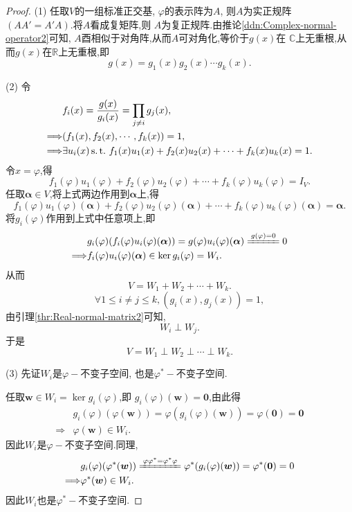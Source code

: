 \begin{proof}
  (1) 任取$V$的一组标准正交基, $\varphi$的表示阵为$A$,
  则$A$为实正规阵$(AA'=A'A)$.将$A$看成复矩阵,则
  $A$为复正规阵.由推论\ref{ddn:Complex-normal-operator2}可知,
  $A$酉相似于对角阵,从而$A$可对角化,等价于$g(x)$在
  $\mathbb{C}$上无重根,从而$g(x)$在$\mathbb{R}$上无重根,即
  \[
    g(x)=g_1(x)g_2(x)\cdots g_k(x).
  \]

  (2) 令
  \begin{align*}
    & f_i(x)=\frac{g(x)}{g_i(x)}=\prod_{j\neq i}g_j(x),\\
    \Longrightarrow & (f_1(x),f_2(x),\cdots,f_k(x))=1,\\
    \Longrightarrow & \exists u_i(x) \operatorname{{}s.t.{}}  f_1(x)u_1(x)+f_2(x)u_2(x)+\cdots+f_k(x)u_k(x)=1.
  \end{align*}
  令$x=\varphi$,得
  \[
    f_1(\varphi)u_1(\varphi)+f_2(\varphi)u_2(\varphi)+\cdots+f_k(\varphi)u_k(\varphi)=I_V.
  \]
  任取$\bm{\alpha}\in V$,将上式两边作用到$\bm{\alpha}$上,得
  \[
    f_1(\varphi)u_1(\varphi)(\bm{\alpha})+f_2(\varphi)u_2(\varphi)(\bm{\alpha})+\cdots+f_k(\varphi)u_k(\varphi)(\bm{\alpha})=\bm{\alpha}.
  \]
  将$g_i(\varphi)$作用到上式中任意项上,即
  \begin{align*}
    & g_i(\varphi)(f_i(\varphi)u_i(\varphi)(\bm{\alpha}))=
      g(\varphi)u_i(\varphi)(\bm{\alpha}) \xlongequal {g(\varphi)=0} 0\\
    \Longrightarrow & f_i(\varphi)u_i(\varphi)(\bm{\alpha})\in\ker g_i(\varphi)= W_i.
  \end{align*}
  从而
  \[
    V=W_1+W_2+\cdots+W_k.
  \]
  \[
    \forall 1\leq i \neq j \leq k, (g_i(x),g_j(x))=1,
  \]
  由引理\ref{thr:Real-normal-matrix2}可知,
  \[
    W_i\perp W_j.
  \]
  于是
  \[
    V=W_1\perp W_2 \perp\cdots\perp W_k.
  \]

  (3) 先证$W_i$是$\varphi-$不变子空间,
  也是$\varphi^*-$不变子空间.

  任取$\bm{w}\in W_i=\ker g_i(\varphi)$,即
  $g_i(\varphi)(\bm{w})=\bm{0}$,由此得
  \begin{align*}
    & g_i(\varphi)(\varphi(\bm{w}))=\varphi(g_i(\varphi)(\bm{w}))
      =\varphi(\bm{0})=\bm{0}\\
    \Longrightarrow & \varphi(\bm{w})\in W_i.
  \end{align*}
  因此$W_i$是$\varphi-$不变子空间.同理,
  \begin{align*}
    & g_i(\varphi)(\varphi^*(\bm{w})) \xlongequal
      {\varphi\varphi^*=\varphi^*\varphi}
      \varphi^*(g_i(\varphi)(\bm{w})) = \varphi^*(\bm{0})=0\\
    \Longrightarrow & \varphi^*(\bm{w})\in W_i.
  \end{align*}
  因此$W_i$也是$\varphi^*-$不变子空间.


\end{proof}
